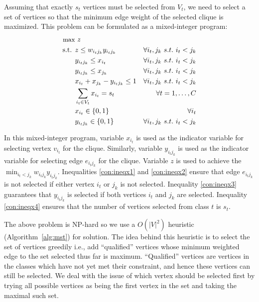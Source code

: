 Assuming that exactly $s_t$ vertices must be selected from $V_t$, we
need to select a set of vertices so that the minimum edge weight of
the selected clique is maximized.
%
This problem can be formulated as a mixed-integer program: %
%
\begin{align} \footnotesize
\textbf{$\max$}        & \notag
             \   z \\
\text{s.t.     }&\label{con:min}
             z\le w_{i_tj_k} y_{i_tj_k}           & \forall i_t,j_k \ s.t.\  i_t<j_k\\
            & \label{con:ineqx1}
              y_{i_tj_k} \leq x_{i_t}             & \forall i_t,j_k \ s.t.\ i_t<j_k \\
            & \label{con:ineqx2}
              y_{i_tj_k} \leq x_{j_k}             & \forall i_t,j_k \ s.t.\ i_t<j_k\\
            & \label{con:ineqx3}
            x_{i_t}+x_{j_k}-y_{i_tj_k}\le 1     & \forall i_t,j_k \  s.t.\ i_t<j_k\\
            & \label{con:ineqx4}
            \sum_{i_t\in V_t} x_{i_t}= s_t        & \forall t=1,\ldots , C \\
            & \notag
            x_{i_t} \in\{0,1\}        & \forall i_t\\
            & \notag
            y_{i_tj_k} \in\{0,1\}                 & \forall i_t,j_k \  s.t.\ i_t < j_k
\end{align}

In this mixed-integer program, variable $x_{i_t}$ is used as the
indicator variable for selecting vertex $v_{i_t}$ for the clique.
%
Similarly, variable $y_{i_tj_k}$ is used as the indicator variable for
selecting edge $e_{i_tj_k}$ for the clique.
%
Variable $z$ is used to achieve the $\min_{i_t<j_k}{w_{i_tj_k}
y_{i_tj_k} }$.
%
Inequalities \ref{con:ineqx1} and \ref{con:ineqx2} ensure that edge
$e_{i_tj_k}$ is not selected if either vertex $i_t$ or $j_k$ is not
selected.
%
Inequality \ref{con:ineqx3} guarantees that $y_{i_tj_k}$ is
selected if both vertices $i_t$ and $j_k$ are selected.
%
Inequality \ref{con:ineqx4} ensures that the number of vertices
selected from class $t$ is $s_t$.
%

The above problem is NP-hard so we use a $O(|V|^2)$ heuristic
(Algorithm~\ref{alg:mst}) for solution.
%
The idea behind this heuristic is to select the set of vertices
greedily i.e., add ``qualified'' vertices whose minimum weighted edge
to the set selected thus far is maximum.
%
``Qualified'' vertices are vertices in the classes which have not yet
met their constraint, and hence these vertices can still be selected.
%
%
We deal with the issue of which vertex should be selected first by
trying all possible vertices as being the first vertex in the set and
taking the maximal such set.
%

